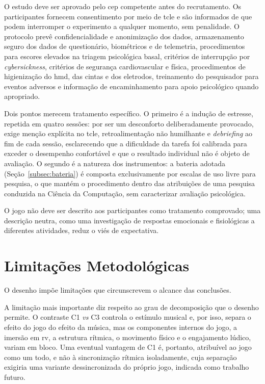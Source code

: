 O estudo deve ser aprovado pelo \gls{cep} competente antes do recrutamento. Os participantes fornecem consentimento por meio de \gls{tcle} e são informados de que podem interromper o experimento a qualquer momento, sem penalidade. O protocolo prevê confidencialidade e anonimização dos dados, armazenamento seguro dos dados de questionário, biométricos e de telemetria, procedimentos para escores elevados na triagem psicológica basal, critérios de interrupção por \textit{cybersickness}, critérios de segurança cardiovascular e física, procedimentos de higienização do \gls{hmd}, das cintas e dos eletrodos, treinamento do pesquisador para eventos adversos e informação de encaminhamento para apoio psicológico quando apropriado.

Dois pontos merecem tratamento específico. O primeiro é a indução de estresse, repetida em quatro sessões: por ser um desconforto deliberadamente provocado, exige menção explícita no \gls{tcle}, retroalimentação não humilhante e \textit{debriefing} ao fim de cada sessão, esclarecendo que a dificuldade da tarefa foi calibrada para exceder o desempenho confortável e que o resultado individual não é objeto de avaliação. O segundo é a natureza dos instrumentos: a bateria adotada (Seção~\ref{subsec:bateria}) é composta exclusivamente por escalas de uso livre para pesquisa, o que mantém o procedimento dentro das atribuições de uma pesquisa conduzida na Ciência da Computação, sem caracterizar avaliação psicológica.

O jogo não deve ser descrito aos participantes como tratamento comprovado; uma descrição neutra, como uma investigação de respostas emocionais e fisiológicas a diferentes atividades, reduz o viés de expectativa. 

\section{Limitações Metodológicas}\label{sec:limitacoes}

O desenho impõe limitações que circunscrevem o alcance das conclusões.

A limitação mais importante diz respeito ao grau de decomposição que o desenho permite. O contraste C1 \textit{vs} C3 controla o estímulo musical e, por isso, separa o efeito do jogo do efeito da música, mas os componentes internos do jogo, a imersão em \gls{rv}, a estrutura rítmica, o movimento físico e o engajamento lúdico, variam em bloco. Uma eventual vantagem de C1 é, portanto, atribuível ao jogo como um todo, e não à sincronização rítmica isoladamente, cuja separação exigiria uma variante dessincronizada do próprio jogo, indicada como trabalho futuro.

